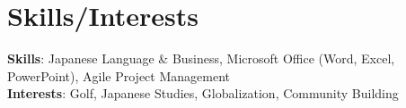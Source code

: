 \documentclass[letterpaper,11pt]{article}
\begin{document}
\section{Skills/Interests}
\begin{itemize}[leftmargin=0.15in, label={}]
  \small{\item{
   \textbf{Skills}{: Japanese Language \& Business, Microsoft Office (Word, Excel, PowerPoint), Agile Project Management} \\
   \textbf{Interests}{: Golf, Japanese Studies, Globalization, Community Building} \\
  }}
\end{itemize}

\end{document}
